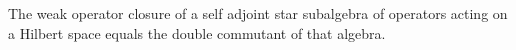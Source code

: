%


\begin{theorem}
  \label{def:commutant}
  \label{thm:double_commutant}
  \leanok
  The weak operator closure of a self adjoint star subalgebra of operators acting on a Hilbert space equals the double commutant of that algebra.
\end{theorem}
